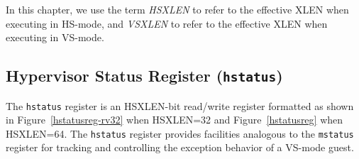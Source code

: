 In this chapter, we use the term {\em HSXLEN} to refer to the effective XLEN
when executing in HS-mode, and {\em VSXLEN} to refer to the effective
XLEN when executing in VS-mode.

\subsection{Hypervisor Status Register ({\tt hstatus})}

The {\tt hstatus} register is an HSXLEN-bit read/write register
formatted as shown in Figure~\ref{hstatusreg-rv32} when HSXLEN=32 and
Figure~\ref{hstatusreg} when HSXLEN=64.
The {\tt hstatus}
register provides facilities analogous to the {\tt mstatus} register
for tracking and controlling the exception behavior of a VS-mode guest.

\begin{figure*}[h!]
{\footnotesize
\begin{center}
\setlength{\tabcolsep}{4pt}
\end{center}
}
\vspace{-0.1in}
\caption{Hypervisor status register ({\tt hstatus}) when HSXLEN=32.}
\label{hstatusreg-rv32}
\end{figure*}

